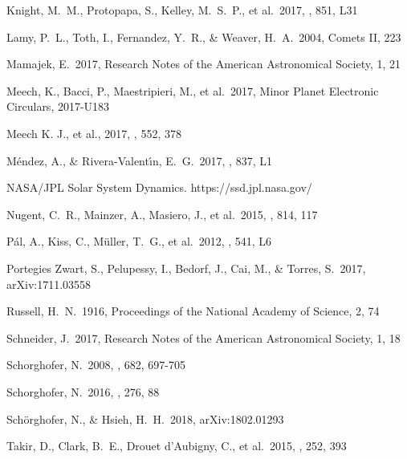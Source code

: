 \documentclass[a4paper,fleqn,usenatbib]{mnras}
\begin{document}
\begin{thebibliography}{99}
 Knight, M.~M., Protopapa, S., Kelley, M.~S.~P., et al.\ 2017, \apjl, 851, L31 

 Lamy, P.~L., Toth, I., Fernandez, Y.~R., \& Weaver, H.~A.\ 2004, Comets II, 223 

 Mamajek, E.\ 2017, Research Notes of the American Astronomical Society, 1, 21 

 Meech, K., Bacci, P., Maestripieri, M., et al.\ 2017, Minor Planet Electronic Circulars, 2017-U183

 Meech K. J., et al., 2017, \nat, 552, 378

 M{\'e}ndez, A., \& Rivera-Valent{\'{\i}}n, E.~G.\ 2017, \apjl, 837, L1 

 NASA/JPL Solar System Dynamics. https://ssd.jpl.nasa.gov/

 Nugent, C.~R., Mainzer, A., Masiero, J., et al.\ 2015, \apj, 814, 117 

 P{\'a}l, A., Kiss, C., M{\"u}ller, T.~G., et al.\ 2012, \aap, 541, L6 

 Portegies Zwart, S., Pelupessy, I., Bedorf, J., Cai, M., \& Torres, S.\ 2017, arXiv:1711.03558

 Russell, H.~N.\ 1916, Proceedings of the National Academy of Science, 2, 74 

 Schneider, J.\ 2017, Research Notes of the American Astronomical Society, 1, 18

 Schorghofer, N.\ 2008, \apj, 682, 697-705 

 Schorghofer, N.\ 2016, \icarus, 276, 88

 Sch{\"o}rghofer, N., \& Hsieh, H.~H.\ 2018, arXiv:1802.01293

 Takir, D., Clark, B.~E., Drouet d'Aubigny, C., et al.\ 2015, \icarus, 252, 393 


\end{thebibliography}
\end{document}

